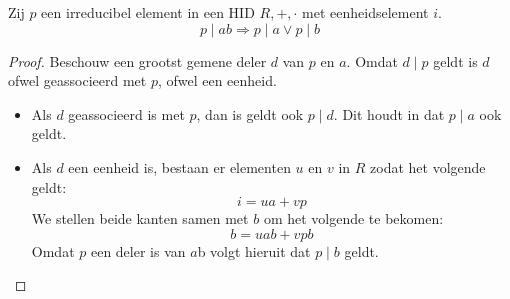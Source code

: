 \documentclass[main.tex]{subfiles}
\begin{document}
\begin{lem}
  \label{lem:irreducibel-element-in-HID-deelt}
  Zij $p$ een irreducibel element in een HID $R,+,\cdot$ met eenheidselement $i$.
  \[ p\mid ab \Rightarrow p\mid a \vee p\mid b \]

  \begin{proof}
    Beschouw een grootst gemene deler $d$ van $p$ en $a$.
    Omdat $d\mid p$ geldt is $d$ ofwel geassocieerd met $p$, ofwel een eenheid.
    \begin{itemize}
    \item Als $d$ geassocieerd is met $p$, dan is geldt ook $p \mid d$. Dit houdt in dat $p \mid a$ ook geldt.
    \item Als $d$ een eenheid is, bestaan er elementen $u$ en $v$ in $R$ zodat het volgende geldt:
      \[ i = ua + vp \]
      We stellen beide kanten samen met $b$ om het volgende te bekomen:
      \[ b= uab + vpb \]
      Omdat $p$ een deler is van $a$b volgt hieruit dat $p \mid b$ geldt.
    \end{itemize}
  \end{proof}
\end{lem}
\end{document}
